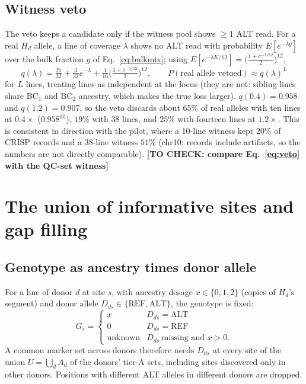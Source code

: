 \documentclass[11pt]{article}
\newcommand{\REF}{\mathrm{REF}}
\newcommand{\ALT}{\mathrm{ALT}}
\newcommand{\Hd}{H_d}
\newcommand{\todo}[1]{\textbf{[TO CHECK: #1]}}
\begin{document}
\subsection{Witness veto}
The veto keeps a candidate only if the witness pool shows $\ge1$ ALT read. For a real $\Hd$ allele, a line of coverage $\lambda$ shows no ALT read with
probability $E[e^{-\lambda g}]$ over the bulk fraction $g$ of Eq.~\eqref{eq:bulkmix}; using
$E[e^{-\lambda K/12}]=\big(\tfrac{1+e^{-\lambda/12}}{2}\big)^{12}$,
\begin{equation}
q(\lambda)=\tfrac{27}{32}+\tfrac{3}{32}e^{-\lambda}+\tfrac{1}{16}\Big(\tfrac{1+e^{-\lambda/12}}{2}\Big)^{12},
\qquad P(\text{real allele vetoed})\approx q(\lambda)^{L}
\label{eq:veto}
\end{equation}
for $L$ lines, treating lines as independent at the locus (they are not: sibling lines share BC$_1$ and BC$_2$ ancestry, which makes the true
loss larger). $q(0.4)=0.958$ and $q(1.2)=0.907$, so the veto discards about $65\%$ of real alleles with ten lines at $0.4\times$
($0.958^{10}$), $19\%$ with 38 lines, and $25\%$ with fourteen lines at $1.2\times$. This is consistent in direction with the pilot, where a
10-line witness kept $20\%$ of CRISP records and a 38-line witness $51\%$ (chr10; records include artifacts, so the numbers are not
directly comparable). \todo{compare Eq.~\eqref{eq:veto} with the QC-set witness}

\section{The union of informative sites and gap filling}
\label{sec:union}

\subsection{Genotype as ancestry times donor allele}
For a line of donor $d$ at site $s$, with ancestry dosage $x\in\{0,1,2\}$ (copies of $\Hd$'s segment) and donor allele $D_{ds}\in\{\REF,\ALT\}$,
the genotype is fixed:
\begin{equation}
G_s=\begin{cases}x & D_{ds}=\ALT\\ 0 & D_{ds}=\REF\\ \text{unknown} & D_{ds}\ \text{missing and } x>0.\end{cases}
\label{eq:projection}
\end{equation}
A common marker set across donors therefore needs $D_{ds}$ at every site of the union $U=\bigcup_d A_d$ of the donors' tier-A sets,
including sites discovered only in other donors. Positions with different ALT alleles in different donors are dropped.
\end{document}
